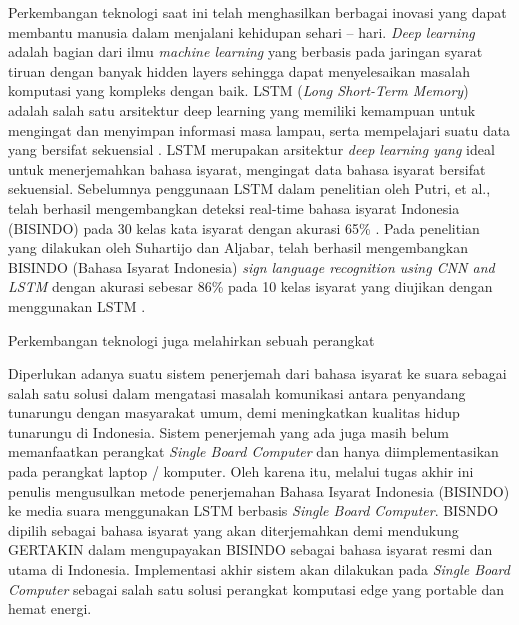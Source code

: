 Perkembangan teknologi saat ini telah menghasilkan berbagai inovasi yang dapat membantu manusia dalam menjalani kehidupan sehari – hari. \emph{Deep learning} adalah bagian dari ilmu \emph{machine learning} yang berbasis pada jaringan syarat tiruan dengan banyak hidden layers sehingga dapat menyelesaikan masalah komputasi yang kompleks dengan baik. LSTM (\emph{Long Short-Term Memory}) adalah salah satu arsitektur deep learning yang memiliki kemampuan untuk mengingat dan menyimpan informasi masa lampau, serta mempelajari suatu data yang bersifat sekuensial \parencite{sadli2020}. LSTM merupakan arsitektur \emph{deep learning yang} ideal untuk menerjemahkan bahasa isyarat, mengingat data bahasa isyarat bersifat sekuensial. Sebelumnya penggunaan LSTM dalam penelitian oleh Putri, et al., telah berhasil mengembangkan deteksi real-time bahasa isyarat Indonesia (BISINDO) pada 30 kelas kata isyarat dengan akurasi 65\% \parencite{putri2022}. Pada penelitian yang dilakukan oleh Suhartijo dan Aljabar, telah berhasil mengembangkan BISINDO (Bahasa Isyarat Indonesia) \emph{sign language recognition using CNN and LSTM} dengan akurasi sebesar 86\% pada 10 kelas isyarat yang diujikan dengan menggunakan LSTM \parencite{aljabar2020}. 

Perkembangan teknologi juga melahirkan sebuah perangkat   


Diperlukan adanya suatu sistem penerjemah dari bahasa isyarat ke suara sebagai salah satu solusi dalam mengatasi masalah komunikasi antara penyandang tunarungu dengan masyarakat umum, demi meningkatkan kualitas hidup tunarungu di Indonesia. Sistem penerjemah yang ada juga masih belum memanfaatkan perangkat \emph{Single Board Computer} dan hanya diimplementasikan pada perangkat laptop / komputer. Oleh karena itu, melalui tugas akhir ini penulis mengusulkan metode penerjemahan Bahasa Isyarat Indonesia (BISINDO) ke media suara menggunakan LSTM berbasis \emph{Single Board Computer}. BISNDO dipilih sebagai bahasa isyarat yang akan diterjemahkan demi mendukung GERTAKIN dalam mengupayakan BISINDO sebagai bahasa isyarat resmi dan utama di Indonesia. Implementasi akhir sistem akan dilakukan pada \emph{Single Board Computer} sebagai salah satu solusi perangkat komputasi edge yang portable dan hemat energi.

